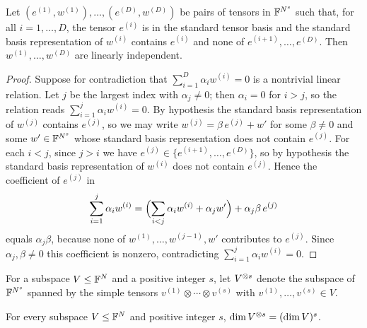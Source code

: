 \begin{lemma}
  \label{lem:lin-indep}
  Let $(e^{(1)}, w^{(1)}), \dots, (e^{(D)}, w^{(D)})$ be pairs of tensors in
  $\mathbb{F}^{N^s}$ such that, for all $i = 1, \dots, D$, the tensor $e^{(i)}$ is in the
  standard tensor basis and the standard basis representation of $w^{(i)}$
  contains $e^{(i)}$ and none of $e^{(i+1)}, \dots, e^{(D)}$. Then
  $w^{(1)}, \dots, w^{(D)}$ are linearly independent.
\end{lemma}
\begin{proof}
  Suppose for contradiction that $\sum_{i=1}^{D} \alpha_i w^{(i)} = 0$ is a
  nontrivial linear relation. Let $j$ be the largest index with
  $\alpha_j \neq 0$; then $\alpha_i = 0$ for $i > j$, so the relation reads
  $\sum_{i=1}^{j} \alpha_i w^{(i)} = 0$. By hypothesis the standard basis
  representation of $w^{(j)}$ contains $e^{(j)}$, so we may write
  $w^{(j)} = \beta\, e^{(j)} + w'$ for some $\beta \neq 0$ and some
  $w' \in \mathbb{F}^{N^s}$ whose standard basis representation does not contain
  $e^{(j)}$. For each $i < j$, since $j > i$ we have
  $e^{(j)} \in \{e^{(i+1)}, \dots, e^{(D)}\}$, so by hypothesis the standard
  basis representation of $w^{(i)}$ does not contain $e^{(j)}$. Hence the
  coefficient of $e^{(j)}$ in
  \[
    \sum_{i=1}^{j} \alpha_i w^{(i)}
      = \Bigl(\sum_{i<j} \alpha_i w^{(i)} + \alpha_j w'\Bigr)
        + \alpha_j \beta\, e^{(j)}
  \]
  equals $\alpha_j \beta$, because none of $w^{(1)}, \dots, w^{(j-1)}, w'$
  contributes to $e^{(j)}$. Since $\alpha_j, \beta \neq 0$ this coefficient is
  nonzero, contradicting $\sum_{i=1}^{j} \alpha_i w^{(i)} = 0$.
\end{proof}

\begin{definition}
  \label{def:tensor-power}
  For a subspace $V \le \mathbb{F}^N$ and a positive integer $s$, let $V^{\otimes s}$
  denote the subspace of $\mathbb{F}^{N^s}$ spanned by the simple tensors
  $v^{(1)} \otimes \cdots \otimes v^{(s)}$ with $v^{(1)}, \dots, v^{(s)} \in V$.
\end{definition}

\begin{lemma}
  \label{lem:tensor-power-dim}
  \mathlibok
  For every subspace $V \le \mathbb{F}^N$ and positive integer $s$,
  $\dim V^{\otimes s} = (\dim V)^s$.
\end{lemma}


